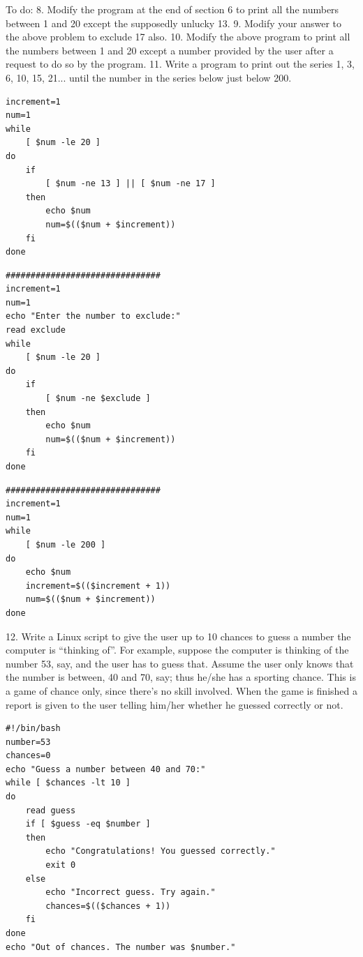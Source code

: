 \documentclass[a4paper]{article}
\begin{document}
\textcolor{green!50!black}
{
To do:
8. Modify the program at the end of section 6 to print all the
numbers between 1 and 20 except the supposedly
unlucky 13.
9. Modify your answer to the above problem to exclude 17
also.
10. Modify the above program to print all the numbers
between 1 and 20 except a number provided by the user
after a request to do so by the program.
11. Write a program to print out the series
1, 3, 6, 10, 15, 21...
until the number in the series below just below 200.
}
\begin{verbatim}
increment=1
num=1
while
    [ $num -le 20 ] 
do  
    if
        [ $num -ne 13 ] || [ $num -ne 17 ]
    then
        echo $num
        num=$(($num + $increment))
    fi
done    
\end{verbatim}
\begin{verbatim}
###############################
increment=1
num=1
echo "Enter the number to exclude:"
read exclude
while
    [ $num -le 20 ] 
do  
    if
        [ $num -ne $exclude ]
    then
        echo $num
        num=$(($num + $increment))
    fi
done    
\end{verbatim}
\begin{verbatim}
###############################
increment=1
num=1
while
    [ $num -le 200 ]    
do
    echo $num
    increment=$(($increment + 1))
    num=$(($num + $increment))
done
\end{verbatim}
\vspace{1em}

\noindent
\textcolor{green!50!black}
{
12. Write a Linux script to give the user up to 10 chances to guess a
number the computer is “thinking of”. For example, suppose the
computer is thinking of the number 53, say, and the user has to guess that.
Assume the user only knows that the number is between, 40 and 70, say;
thus he/she has a sporting chance.
This is a game of chance only, since there’s no skill involved. When the
game is finished a report is given to the user telling him/her whether he
guessed correctly or not.
}
\begin{verbatim}
#!/bin/bash
number=53
chances=0
echo "Guess a number between 40 and 70:"
while [ $chances -lt 10 ]
do
    read guess
    if [ $guess -eq $number ]
    then
        echo "Congratulations! You guessed correctly."
        exit 0
    else
        echo "Incorrect guess. Try again."
        chances=$(($chances + 1))
    fi
done
echo "Out of chances. The number was $number."
\end{verbatim}
\end{document}
